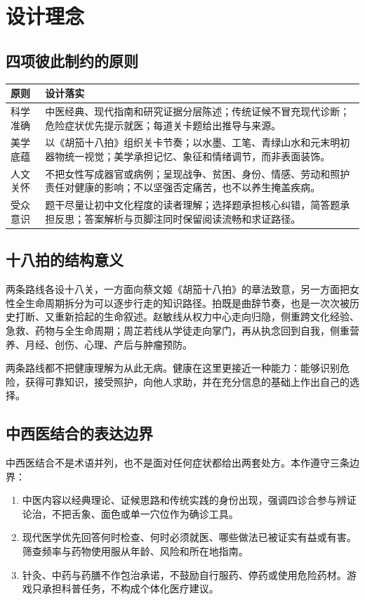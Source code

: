 \documentclass[lang=cn,a4paper,11pt,citestyle=gb7714-2015,bibstyle=gb7714-2015]{elegantpaper}
\begin{document}
\clearpage
\section{设计理念}

\subsection{四项彼此制约的原则}

\begin{longtable}{p{}p{}}
\toprule
原则 & 设计落实\\
\midrule
科学准确 & 中医经典、现代指南和研究证据分层陈述；传统证候不冒充现代诊断；危险症状优先提示就医；每道关卡题给出推导与来源。\\
美学底蕴 & 以《胡笳十八拍》组织关卡节奏；以水墨、工笔、青绿山水和元末明初器物统一视觉；美学承担记忆、象征和情绪调节，而非表面装饰。\\
人文关怀 & 不把女性写成器官或病例；呈现战争、贫困、身份、情感、劳动和照护责任对健康的影响；不以坚强否定痛苦，也不以养生掩盖疾病。\\
受众意识 & 题干尽量让初中文化程度的读者理解；选择题承担核心纠错，简答题承担反思；答案解析与页脚注同时保留阅读流畅和求证路径。\\
\bottomrule
\end{longtable}

\subsection{十八拍的结构意义}

两条路线各设十八关，一方面向蔡文姬《胡笳十八拍》的章法致意，另一方面把女性全生命周期拆分为可以逐步行走的知识路径。拍既是曲辞节奏，也是一次次被历史打断、又重新拾起的生命叙述。赵敏线从权力中心走向归隐，侧重跨文化经验、急救、药物与全生命周期；周芷若线从学徒走向掌门，再从执念回到自我，侧重营养、月经、创伤、心理、产后与肿瘤预防。

两条路线都不把健康理解为从此无病。健康在这里更接近一种能力：能够识别危险，获得可靠知识，接受照护，向他人求助，并在充分信息的基础上作出自己的选择。

\subsection{中西医结合的表达边界}

中西医结合不是术语并列，也不是面对任何症状都给出两套处方。本作遵守三条边界：

\begin{enumerate}[leftmargin=*]
  \item 中医内容以经典理论、证候思路和传统实践的身份出现，强调四诊合参与辨证论治，不把舌象、面色或单一穴位作为确诊工具。
  \item 现代医学优先回答何时检查、何时必须就医、哪些做法已被证实有益或有害。筛查频率与药物使用服从年龄、风险和所在地指南。
  \item 针灸、中药与药膳不作包治承诺，不鼓励自行服药、停药或使用危险药材。游戏只承担科普任务，不构成个体化医疗建议。
\end{enumerate}
\end{document}
